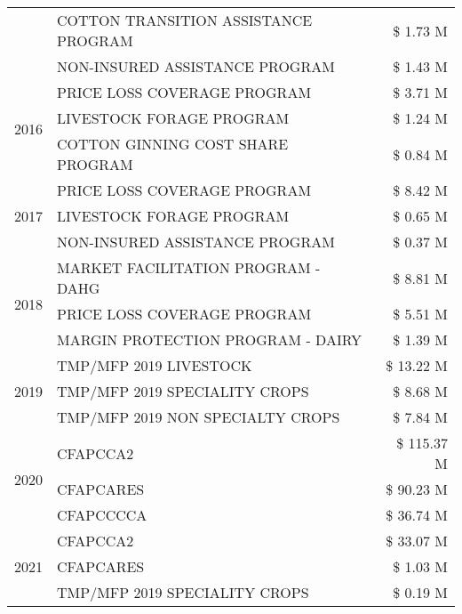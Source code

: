 \begin{tabular}{llr}
 & COTTON TRANSITION ASSISTANCE PROGRAM & \$ 1.73 M \\
 & NON-INSURED ASSISTANCE PROGRAM & \$ 1.43 M \\
\cline{1-3}
\multirow[t]{3}{*}{2016} & PRICE LOSS COVERAGE PROGRAM                   & \$ 3.71 M \\
 & LIVESTOCK FORAGE PROGRAM                      & \$ 1.24 M \\
 & COTTON GINNING COST SHARE PROGRAM             & \$ 0.84 M \\
\cline{1-3}
\multirow[t]{3}{*}{2017} & PRICE LOSS COVERAGE PROGRAM & \$ 8.42 M \\
 & LIVESTOCK FORAGE PROGRAM & \$ 0.65 M \\
 & NON-INSURED ASSISTANCE PROGRAM & \$ 0.37 M \\
\cline{1-3}
\multirow[t]{3}{*}{2018} & MARKET FACILITATION PROGRAM - DAHG & \$ 8.81 M \\
 & PRICE LOSS COVERAGE PROGRAM & \$ 5.51 M \\
 & MARGIN PROTECTION PROGRAM - DAIRY & \$ 1.39 M \\
\cline{1-3}
\multirow[t]{3}{*}{2019} & TMP/MFP 2019 LIVESTOCK & \$ 13.22 M \\
 & TMP/MFP 2019 SPECIALITY CROPS & \$ 8.68 M \\
 & TMP/MFP 2019 NON SPECIALTY CROPS & \$ 7.84 M \\
\cline{1-3}
\multirow[t]{3}{*}{2020} & CFAPCCA2 & \$ 115.37 M \\
 & CFAPCARES & \$ 90.23 M \\
 & CFAPCCCCA & \$ 36.74 M \\
\cline{1-3}
\multirow[t]{3}{*}{2021} & CFAPCCA2 & \$ 33.07 M \\
 & CFAPCARES & \$ 1.03 M \\
 & TMP/MFP 2019 SPECIALITY CROPS & \$ 0.19 M \\
\cline{1-3}
\bottomrule
\end{tabular}
